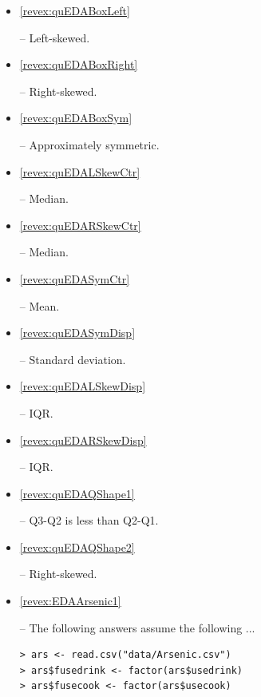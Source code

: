 \documentclass[10pt,openany]{book}\usepackage[]{graphicx}\usepackage[]{color}
\makeatletter
\newenvironment{kframe}{%
 \def\at@end@of@kframe{}%
 \ifinner\ifhmode%
  \def\at@end@of@kframe{\end{minipage}}%
  \begin{minipage}{\columnwidth}%
 \fi\fi%
 \def\FrameCommand##1{\hskip\@totalleftmargin \hskip-\fboxsep
 \colorbox{shadecolor}{##1}\hskip-\fboxsep
     \hskip-\linewidth \hskip-\@totalleftmargin \hskip\columnwidth}%
 \MakeFramed {\advance\hsize-\width
   \@totalleftmargin\z@ \linewidth\hsize
   \@setminipage}}%
 {\par\unskip\endMakeFramed%
 \at@end@of@kframe}
\newenvironment{knitrout}{}{} %
\makeatother
\begin{document}
\begin{itemize}
\begin{knitrout}
{}



\end{knitrout}

  \item \hypertarget{ans:quEDABoxLeft}{\ref{revex:quEDABoxLeft}} --  Left-skewed.
  \item \hypertarget{ans:quEDABoxRight}{\ref{revex:quEDABoxRight}} --  Right-skewed.
  \item \hypertarget{ans:quEDABoxSym}{\ref{revex:quEDABoxSym}} --  Approximately symmetric.
  \item \hypertarget{ans:quEDALSkewCtr}{\ref{revex:quEDALSkewCtr}} --  Median.
  \item \hypertarget{ans:quEDARSkewCtr}{\ref{revex:quEDARSkewCtr}} --  Median.
  \item \hypertarget{ans:quEDASymCtr}{\ref{revex:quEDASymCtr}} --  Mean.
  \item \hypertarget{ans:quEDASymDisp}{\ref{revex:quEDASymDisp}} --  Standard deviation.
  \item \hypertarget{ans:quEDALSkewDisp}{\ref{revex:quEDALSkewDisp}} --  IQR.
  \item \hypertarget{ans:quEDARSkewDisp}{\ref{revex:quEDARSkewDisp}} --  IQR.
  \item \hypertarget{ans:quEDAQShape1}{\ref{revex:quEDAQShape1}} --  Q3-Q2 is less than Q2-Q1.
  \item \hypertarget{ans:quEDAQShape2}{\ref{revex:quEDAQShape2}} --  Right-skewed.

  \item \hypertarget{ans:EDAArsenic1}{\ref{revex:EDAArsenic1}} -- The following answers assume the following ...
\begin{knitrout}
\color{fgcolor}\begin{kframe}
\begin{verbatim}
> ars <- read.csv("data/Arsenic.csv")
> ars$fusedrink <- factor(ars$usedrink)
> ars$fusecook <- factor(ars$usecook)
\end{verbatim}
\end{kframe}
\end{knitrout}


\end{itemize}
\end{document}
